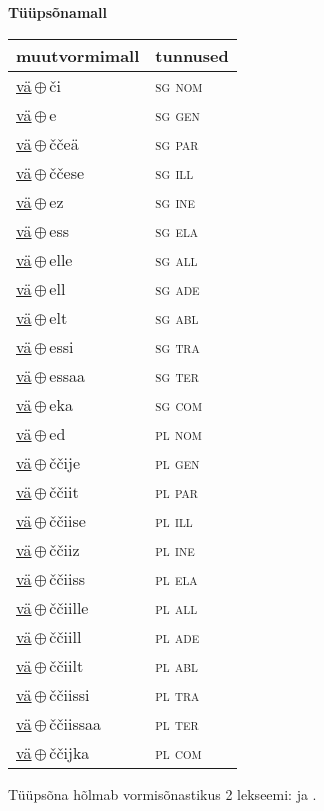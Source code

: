 

\vspace{3.5em}
\noindent \begin{minipage}{\textwidth}
\noindent \textbf{Tüüpsõnamall \,}\\

\begin{sideways}
\begin{tabular}{l l}
muutvormimall & tunnused \\
\hline
\underline{vä}\,$\oplus$\,či & \textsc{ sg nom } \\
\underline{vä}\,$\oplus$\,e & \textsc{ sg gen } \\
\underline{vä}\,$\oplus$\,ččeä & \textsc{ sg par } \\
\underline{vä}\,$\oplus$\,ččese & \textsc{ sg ill } \\
\underline{vä}\,$\oplus$\,ez & \textsc{ sg ine } \\
\underline{vä}\,$\oplus$\,ess & \textsc{ sg ela } \\
\underline{vä}\,$\oplus$\,elle & \textsc{ sg all } \\
\underline{vä}\,$\oplus$\,ell & \textsc{ sg ade } \\
\underline{vä}\,$\oplus$\,elt & \textsc{ sg abl } \\
\underline{vä}\,$\oplus$\,essi & \textsc{ sg tra } \\
\underline{vä}\,$\oplus$\,essaa & \textsc{ sg ter } \\
\underline{vä}\,$\oplus$\,eka & \textsc{ sg com } \\
\underline{vä}\,$\oplus$\,ed & \textsc{ pl nom } \\
\underline{vä}\,$\oplus$\,ččije & \textsc{ pl gen } \\
\underline{vä}\,$\oplus$\,ččiit & \textsc{ pl par } \\
\underline{vä}\,$\oplus$\,ččiise & \textsc{ pl ill } \\
\underline{vä}\,$\oplus$\,ččiiz & \textsc{ pl ine } \\
\underline{vä}\,$\oplus$\,ččiiss & \textsc{ pl ela } \\
\underline{vä}\,$\oplus$\,ččiille & \textsc{ pl all } \\
\underline{vä}\,$\oplus$\,ččiill & \textsc{ pl ade } \\
\underline{vä}\,$\oplus$\,ččiilt & \textsc{ pl abl } \\
\underline{vä}\,$\oplus$\,ččiissi & \textsc{ pl tra } \\
\underline{vä}\,$\oplus$\,ččiissaa & \textsc{ pl ter } \\
\underline{vä}\,$\oplus$\,ččijka & \textsc{ pl com } \\
\end{tabular}
\end{sideways}
\label{tab:tüüpsõnamall-väči}

\end{minipage}

 
\vspace{1em}
\noindent Tüüpsõna hõlmab vormisõnastikus 2 lekseemi:  ja .
